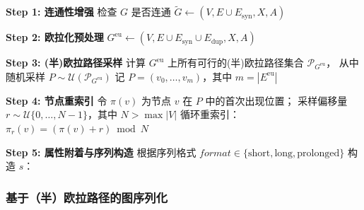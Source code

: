 \begin{algorithm}[t]
\caption{图到Token序列的改进编码算法}
\label{alg:graph_to_token}

\textbf{Step 1: 连通性增强}\;
检查 $G$ 是否连通\;
$\tilde{G} \leftarrow (V, E \cup E_{\mathrm{syn}}, X, A)$\;

\textbf{Step 2: 欧拉化预处理}\;
$G^{\mathrm{eu}} \leftarrow (V, E \cup E_{\mathrm{syn}} \cup E_{\mathrm{dup}}, X, A)$\;

\textbf{Step 3: (半)欧拉路径采样}\;
计算 $G^{\mathrm{eu}}$ 上所有可行的(半)欧拉路径集合 $\mathcal{P}_{G^{\mathrm{eu}}}$，
从中随机采样 $P\sim\mathcal{U}(\mathcal{P}_{G^{\mathrm{eu}}})$\;
记 $P=(v_0,\dots,v_m)$，其中 $m=|E^{\mathrm{eu}}|$\;

\textbf{Step 4: 节点重索引}\;
令 $\pi(v)$ 为节点 $v$ 在 $P$ 中的首次出现位置；
采样偏移量 $r\sim \mathcal{U}\{0,\dots,N-1\}$，其中 $N > \max|V|$\;
循环重索引：$\pi_r(v) = (\pi(v)+r)\bmod N$\;

\textbf{Step 5: 属性附着与序列构造}\;
根据序列格式 $\textit{format} \in \{\text{short},\text{long},\text{prolonged}\}$ 构造 $s$：


\;
\end{algorithm}

\subsubsection{基于（半）欧拉路径的图序列化}

